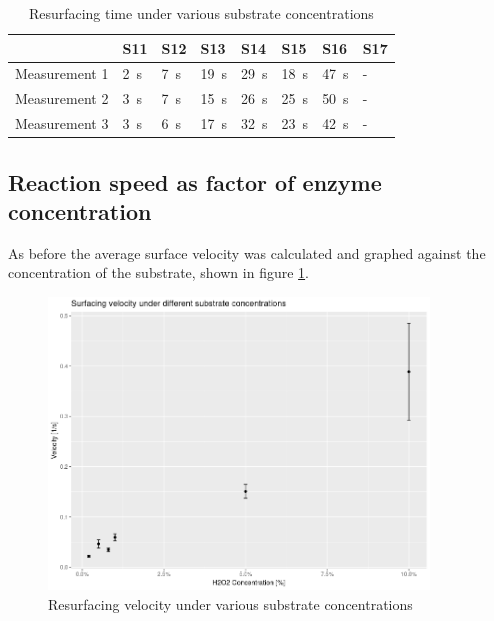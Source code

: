 \documentclass[a4paper,english]{scrreprt}
\begin{document}
\begin{table}
	\centering
	\begin{tabu}{llllllll}
		\toprule
		& S11 & S12 & S13 & S14 & S15 & S16 & S17 \\
		\midrule
		Measurement 1 & \SI{2}{\s} & \SI{7}{\s} & \SI{19}{\s} & \SI{29}{\s} & \SI{18}{\s} & \SI{47}{\s} & - \\ 
		Measurement 2 & \SI{3}{\s} & \SI{7}{\s} & \SI{15}{\s} & \SI{26}{\s} & \SI{25}{\s} & \SI{50}{\s} & - \\ 
		Measurement 3 & \SI{3}{\s} & \SI{6}{\s} & \SI{17}{\s} & \SI{32}{\s} & \SI{23}{\s} & \SI{42}{\s} & - \\ 
		\bottomrule
	\end{tabu}
	\caption{Resurfacing time under various substrate concentrations}
	\label{tbl:substrate_concentrations_time}
\end{table}

\subsection{Reaction speed as factor of enzyme concentration}

As before the average surface velocity was calculated and graphed against the
concentration of the substrate, shown in figure
\ref{fig:substrate_concentration}.

\begin{figure}
	\centering
	\includegraphics[width=0.9\textwidth]{img/substrate_concentration.png}
	\caption{Resurfacing velocity under various substrate concentrations}
	\label{fig:substrate_concentration}
\end{figure}
\end{document}

